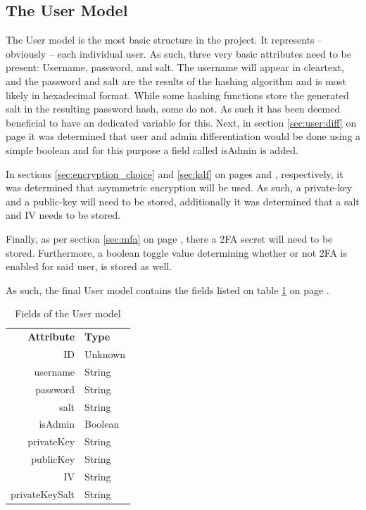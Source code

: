 		\subsection{The User Model}
			The User model is the most basic structure in the project. It represents -- obviously -- each individual user. As such, three very basic attributes need to be present: Username, password, and salt. The username will appear in cleartext, and the password and salt are the results of the hashing algorithm and is most likely in hexadecimal format. While some hashing functions store the generated salt in the resulting password hash, some do not. As such it has been deemed beneficial to have an dedicated variable for this. Next, in section \ref{sec:user:diff} on page \pageref{sec:user:diff} it was determined that user and admin differentiation would be done using a simple boolean and for this purpose a field called isAdmin is added.

			In sections \ref{sec:encryption_choice} and \ref{sec:kdf} on pages \pageref{sec:encryption_choice} and \pageref{sec:kdf}, respectively, it was determined that asymmetric encryption will be used. As such, a private-key and a public-key will need to be stored, additionally it was determined that a salt and IV needs to be stored. 

			Finally, as per section \ref{sec:mfa} on page \pageref{sec:mfa}, there a 2FA secret will need to be stored. Furthermore, a boolean toggle value determining whether or not 2FA is enabled for said user, is stored as well.

			As such, the final User model contains the fields listed on table \ref{fig:model:user} on page \pageref{fig:model:user}.

			\begin{table}[p]
				\centering
				\begin{tabular}{r|l}
					\textbf{Attribute} 		& \textbf{Type} 		\\
					ID 						& Unknown 	\\
					username 				& String 	\\
					password 				& String 	\\
					salt 					& String 	\\
					isAdmin 				& Boolean 	\\
					privateKey  			& String 	\\
					publicKey 				& String 	\\
					IV 						& String 	\\
					privateKeySalt 			& String 	\\
				\end{tabular}
				\caption{Fields of the User model}
				\label{fig:model:user}
			\end{table}

